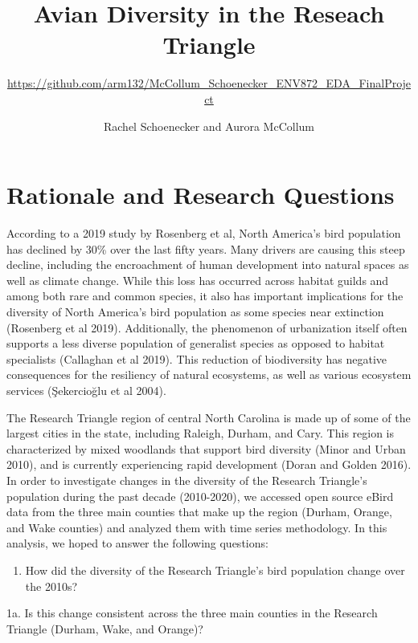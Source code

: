 \documentclass[
  12pt,
]{article}
\title{Avian Diversity in the Reseach Triangle}
\subtitle{\url{https://github.com/arm132/McCollum_Schoenecker_ENV872_EDA_FinalProject}}
\author{Rachel Schoenecker and Aurora McCollum}
\date{}
\providecommand{\tightlist}{%
  \setlength{\itemsep}{0pt}\setlength{\parskip}{0pt}}
\begin{document}
\maketitle

\newpage
\tableofcontents 
\newpage
\listoftables 
\listoffigures 
\newpage

\hypertarget{rationale-and-research-questions}{%
\section{Rationale and Research
Questions}\label{rationale-and-research-questions}}

According to a 2019 study by Rosenberg et al, North America's bird
population has declined by 30\% over the last fifty years. Many drivers
are causing this steep decline, including the encroachment of human
development into natural spaces as well as climate change. While this
loss has occurred across habitat guilds and among both rare and common
species, it also has important implications for the diversity of North
America's bird population as some species near extinction (Rosenberg et
al 2019). Additionally, the phenomenon of urbanization itself often
supports a less diverse population of generalist species as opposed to
habitat specialists (Callaghan et al 2019). This reduction of
biodiversity has negative consequences for the resiliency of natural
ecosystems, as well as various ecosystem services (Şekercioğlu et al
2004).

The Research Triangle region of central North Carolina is made up of
some of the largest cities in the state, including Raleigh, Durham, and
Cary. This region is characterized by mixed woodlands that support bird
diversity (Minor and Urban 2010), and is currently experiencing rapid
development (Doran and Golden 2016). In order to investigate changes in
the diversity of the Research Triangle's population during the past
decade (2010-2020), we accessed open source eBird data from the three
main counties that make up the region (Durham, Orange, and Wake
counties) and analyzed them with time series methodology. In this
analysis, we hoped to answer the following questions:

\begin{enumerate}
\def\labelenumi{\arabic{enumi}.}
\tightlist
\item
  How did the diversity of the Research Triangle's bird population
  change over the 2010s?
\end{enumerate}

1a. Is this change consistent across the three main counties in the
Research Triangle (Durham, Wake, and Orange)?
\end{document}
